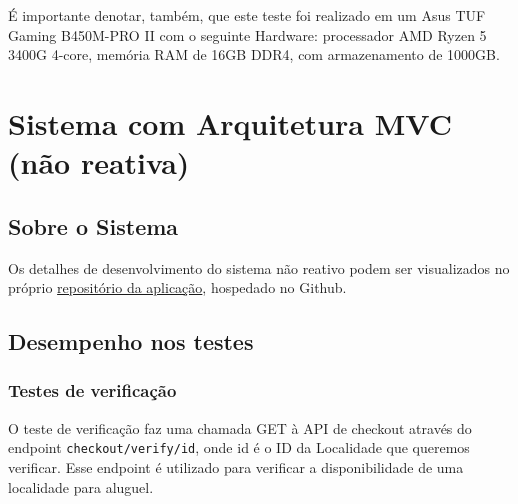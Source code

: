 \documentclass[12pt, openright, oneside, a4paper, article,
  section=TITLE
]{abntex2}
\begin{document}
É importante denotar, também, que este teste foi realizado em um Asus TUF Gaming B450M-PRO II com o seguinte Hardware: processador AMD Ryzen 5 3400G 4-core, memória RAM de 16GB DDR4, com armazenamento de 1000GB.

\section{Sistema com Arquitetura MVC (não reativa)}

\subsection{Sobre o Sistema}

Os detalhes de desenvolvimento do sistema não reativo podem ser visualizados no próprio \href{https://github.com/arturo32/reservago-mvc}{repositório da aplicação}, hospedado no Github. 

\subsection{Desempenho nos testes}

\subsubsection{Testes de verificação}

O teste de verificação faz uma chamada GET à API de checkout através do endpoint \texttt{checkout/verify/{id}}, onde id é o ID da Localidade que queremos verificar. Esse endpoint é utilizado para verificar a disponibilidade de uma localidade para aluguel. 

\begin{table}[htb]
\end{table}
\end{document}
